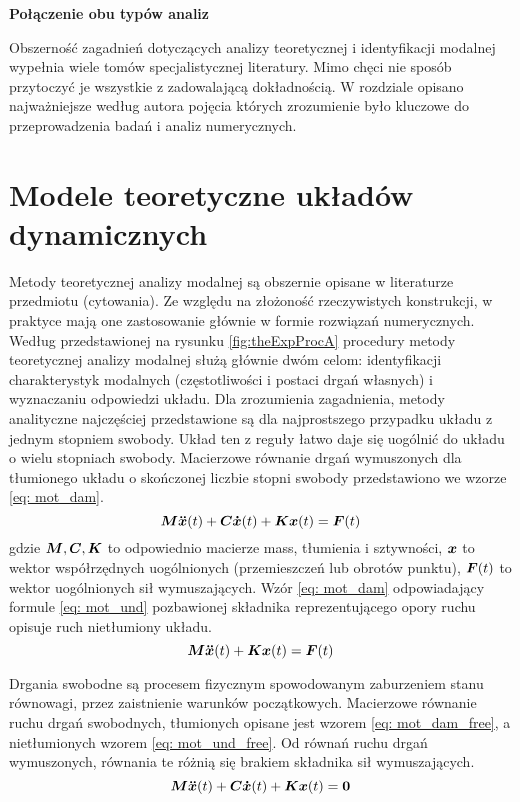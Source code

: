 \textbf{Połączenie obu typów analiz}

Obszerność zagadnień dotyczących analizy teoretycznej i identyfikacji modalnej wypełnia wiele tomów specjalistycznej literatury. Mimo chęci nie sposób przytoczyć je wszystkie z zadowalającą dokładnością. W rozdziale opisano najważniejsze według autora pojęcia których zrozumienie było kluczowe do  przeprowadzenia badań i analiz numerycznych.

\section{Modele teoretyczne układów dynamicznych}
\label{section: eigen}
Metody teoretycznej analizy modalnej są obszernie opisane w literaturze przedmiotu (cytowania). Ze względu na złożoność rzeczywistych konstrukcji, w praktyce mają one zastosowanie głównie w formie rozwiązań numerycznych.  Według przedstawionej na rysunku \ref{fig:theExpProcA} procedury metody teoretycznej analizy modalnej służą głównie dwóm celom: identyfikacji charakterystyk modalnych (częstotliwości i postaci drgań własnych) i wyznaczaniu odpowiedzi układu. Dla zrozumienia zagadnienia, metody analityczne najczęściej przedstawione są dla najprostszego przypadku układu z jednym stopniem swobody. Układ ten z reguły łatwo daje się uogólnić do układu o wielu stopniach swobody. Macierzowe równanie drgań wymuszonych dla tłumionego układu o skończonej liczbie stopni swobody przedstawiono we wzorze \ref{eq: mot_dam}. 
\begin{equation} \label{eq: mot_dam}
\bm{M} \bm{\ddot{x}}(t) +\bm{C} \bm{\dot{x}}(t)+ \bm{Kx}(t) = \bm{F}(t)
\end{equation}
gdzie $\bm{M},\bm{C},\bm{K}$ to odpowiednio macierze mass, tłumienia i sztywności, $\bm{x}$ to wektor współrzędnych uogólnionych (przemieszczeń lub obrotów punktu), $\bm{F}(t)$ to wektor uogólnionych sił wymuszających. Wzór \ref{eq: mot_dam} odpowiadający formule \ref{eq: mot_und} pozbawionej składnika reprezentującego opory ruchu opisuje ruch nietłumiony układu. 
\begin{equation} \label{eq: mot_und}
\bm{M} \bm{\ddot{x}}(t) +\bm{Kx}(t) = \bm{F}(t)
\end{equation}

Drgania swobodne są procesem fizycznym spowodowanym zaburzeniem stanu równowagi, przez zaistnienie warunków początkowych. Macierzowe równanie ruchu drgań swobodnych, tłumionych opisane jest wzorem \ref{eq: mot_dam_free}, a nietłumionych wzorem \ref{eq: mot_und_free}. Od równań ruchu drgań wymuszonych, równania te różnią się brakiem składnika sił wymuszających.
\begin{equation} \label{eq: mot_dam_free}
\bm{M} \bm{\ddot{x}}(t) +\bm{C} \bm{\dot{x}}(t)+ \bm{Kx}(t) = \bm{0}
\end{equation}


